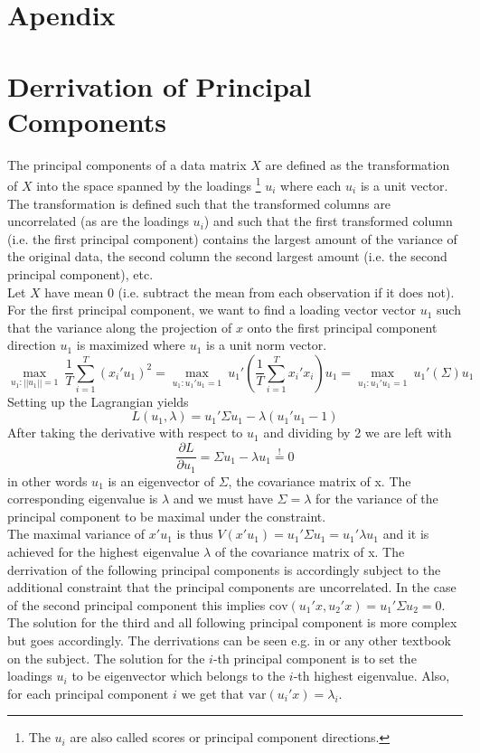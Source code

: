 \documentclass[12pt]{article}
\begin{document}
\clearpage
\newpage
\appendix
\section*{Apendix}

\section{Derrivation of Principal Components}
\label{Derrivation of Principal Components}
The principal components of a data matrix $X$ are defined as the transformation of $X$ into the space spanned by the loadings \footnote{The $u_i$ are also called scores or principal component directions.} $u_i$ where each $u_i$ is a unit vector. The transformation is defined such that the transformed columns are uncorrelated (as are the loadings $u_i$) and such that the first transformed column (i.e. the first principal component) contains the largest amount of the variance of the original data, the second column the second largest amount (i.e. the second principal component), etc. \\

Let $X$ have mean 0 (i.e. subtract the mean from each observation if it does not).
For the first principal component, we want to find a loading vector vector $u_1$ such that the variance along the projection of $x$ onto the first principal component direction $u_1$ is maximized where $u_1$ is a unit norm vector. 
$$\underset{u_1: ||u_1|| = 1}{\max} \ \frac{1}{T} \sum_{i=1}^T(x_i'u_1)^2 = \underset{u_1: u_1'u_1 = 1}{\max} \ u_1' ( \frac{1}{T} \sum_{i=1}^T x_i'x_i )u_1 = \underset{u_1: u_1'u_1 = 1}{\max} \ u_1' (\Sigma)u_1$$
Setting up the Lagrangian yields
$$ L(u_1, \lambda) = u_1' \Sigma u_1 - \lambda(u_1'u_1-1)$$
After taking the derivative with respect to $u_1$ and dividing by 2 we are left with
$$\frac{\partial L}{\partial u_1} = \Sigma u_1 -\lambda u_1 \overset{!}{=} 0$$ in other words $u_1$ is an eigenvector of $\Sigma$, the covariance matrix of x. The corresponding eigenvalue is $\lambda$ and we must have $\Sigma = \lambda$ for the variance of the principal component to be maximal under the constraint. \\
The maximal variance of $x'u_1$ is thus $V(x'u_1) = u_1' \Sigma u_1 = u_1' \lambda u_1$ and it is achieved for the highest eigenvalue $\lambda$ of the covariance matrix of x. The derrivation of the following principal components is accordingly subject to the additional constraint that the principal components are uncorrelated. In the case of the second principal component this implies $\text{cov}(u_1'x, u_2'x) = u_1' \Sigma u_2 = 0$. The solution for the third and all following principal component is more complex but goes accordingly. The derrivations can be seen e.g. in \citet{jolliffe2005principal} or any other textbook on the subject. The solution for the $i$-th principal component is to set the loadings $u_i$ to be eigenvector which belongs to the $i$-th highest eigenvalue. Also, for each principal component $i$ we get that $\text{var}(u_i'x) = \lambda_i$.
\end{document}
